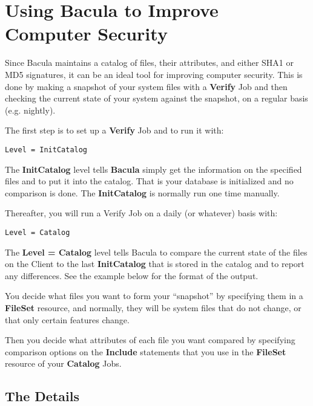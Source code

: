 
\section*{Using Bacula to Improve Computer Security}
\label{_ChapterStart45}

Since Bacula maintains a catalog of files, their attributes, and either SHA1
or MD5 signatures, it can be an ideal tool for improving computer security.
This is done by making a snapshot of your system files with a {\bf Verify} Job
and then checking the current state of your system against the snapshot, on a
regular basis (e.g. nightly). 

The first step is to set up a {\bf Verify} Job and to run it with: 

\footnotesize
\begin{verbatim}
Level = InitCatalog
\end{verbatim}
\normalsize

The {\bf InitCatalog} level tells {\bf Bacula} simply get the information on
the specified files and to put it into the catalog. That is your database is
initialized and no comparison is done. The {\bf InitCatalog} is normally run
one time manually. 

Thereafter, you will run a Verify Job on a daily (or whatever) basis with: 

\footnotesize
\begin{verbatim}
Level = Catalog
\end{verbatim}
\normalsize

The {\bf Level = Catalog} level tells Bacula to compare the current state of
the files on the Client to the last {\bf InitCatalog} that is stored in the
catalog and to report any differences. See the example below for the format of
the output. 

You decide what files you want to form your ``snapshot'' by specifying them in
a {\bf FileSet} resource, and normally, they will be system files that do not
change, or that only certain features change. 

Then you decide what attributes of each file you want compared by specifying
comparison options on the {\bf Include} statements that you use in the {\bf
FileSet} resource of your {\bf Catalog} Jobs. 

\subsection*{The Details}

